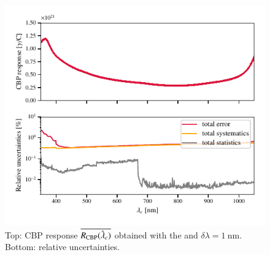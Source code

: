 \begin{figure}[h]
    \centering
    \includegraphics[width=\columnwidth]{fig/cbp_response.pdf}
    \caption{Top: CBP response $\overline{R_{\mathrm{CBP}}(\hat{\lambda}_c)}$ obtained with the \bpinhole and $\delta \lambda = \SI{1}{\nano\meter}$. Bottom: relative uncertainties.}
    \label{fig:cbp_response}
\end{figure}
